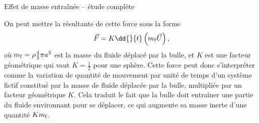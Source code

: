 \begin{exo}[PC][1][devoir]{Effet de masse entraînée -- étude complète}
\begin{quest}
\begin{enumerate}
{
  On peut mettre la résultante de cette force sous la forme
  $$
    \Vec{F} = K \dd{}{t}\left( m_{\rm f} \Vec{U} \right),
  $$
  où $m_{\rm f} = \rho \frac{4}{3}\pi a^3$ est la masse du fluide déplacé par la bulle, et $K$ est une facteur géométrique qui vaut $K=\frac{1}{2}$ pour une sphère. Cette force peut donc s’interpréter comme la variation de quantité de mouvement par unité de temps d’un système fictif constitué par la masse de fluide déplacée par la bulle, multipliée par un facteur géométrique $K$. Cela traduit le fait que la bulle doit entraîner une partie du fluide environnant pour se déplacer, ce qui augmente sa masse inerte d’une quantité $K m_{\rm f}$.
}
\end{enumerate}
\end{quest}
\end{exo}


